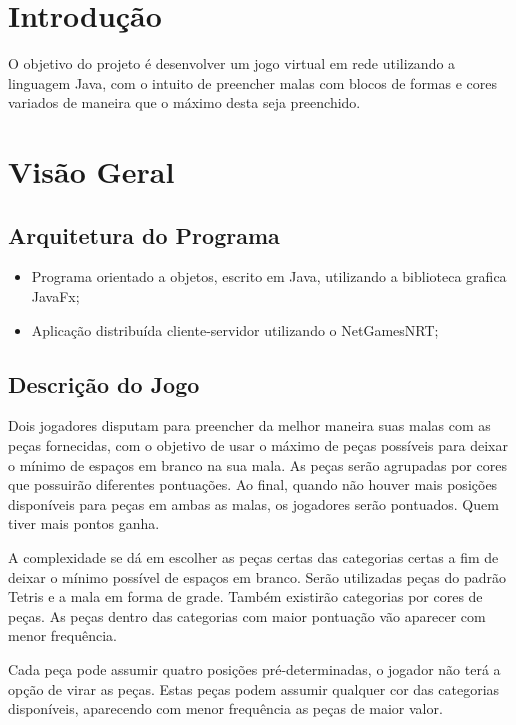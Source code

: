 \documentclass[
	12pt,	
	openany,			
	oneside,			
	a4paper,			
	english,			
	french,			
	spanish,			
	brazil,	
	]{abntex2}
\begin{document}
 
\frenchspacing
\imprimircapa

\tableofcontents*
\cleardoublepage
\textual

\chapter*[Introdução]{Introdução}
 
O objetivo do projeto é desenvolver um jogo virtual em rede utilizando a linguagem Java, 
com o intuito de preencher malas com blocos de formas e cores variados de maneira que o máximo desta seja preenchido.

\chapter{Visão Geral}
 
\section{Arquitetura do Programa}
\begin{itemize}
\item Programa orientado a objetos, escrito em Java, utilizando a biblioteca grafica JavaFx;
\item Aplicação distribuída cliente-servidor utilizando o NetGamesNRT;
\end{itemize}

\section{Descrição do Jogo}

Dois jogadores disputam para preencher da melhor maneira suas malas com as peças fornecidas, com o objetivo de usar o máximo de peças possíveis para deixar o mínimo de espaços em branco na sua mala. As peças serão agrupadas por cores que possuirão diferentes pontuações. Ao final, quando não houver mais posições disponíveis para peças em ambas as malas, os jogadores serão pontuados. Quem tiver mais pontos ganha.

A complexidade se dá em escolher as peças certas das categorias certas a fim de deixar o mínimo possível de espaços em branco. Serão utilizadas peças do padrão Tetris e a mala em forma de grade. Também existirão categorias por cores de peças. As peças dentro das categorias com maior pontuação vão aparecer com menor frequência.

Cada peça pode assumir quatro posições pré-determinadas, o jogador não terá a opção de virar as peças. Estas peças podem assumir qualquer cor das categorias disponíveis, aparecendo com menor frequência as peças de maior valor.
\end{document}
